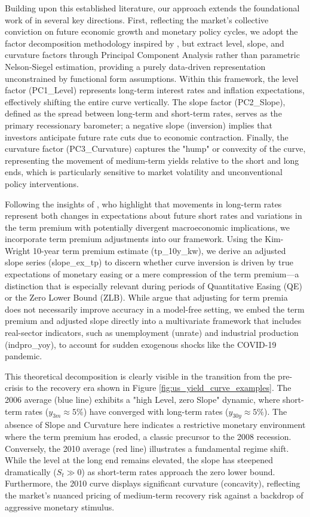 Building upon this established literature, our approach extends the foundational work of \citet{estrellaYieldCurvePredictor1996} in several key directions. First, reflecting the market's collective conviction on future economic growth and monetary policy cycles, we adopt the factor decomposition methodology inspired by \citet{diebold2006forecasting}, but extract level, slope, and curvature factors through Principal Component Analysis rather than parametric Nelson-Siegel estimation, providing a purely data-driven representation unconstrained by functional form assumptions. Within this framework, the level factor (PC1\_Level) represents long-term interest rates and inflation expectations, effectively shifting the entire curve vertically. The slope factor (PC2\_Slope), defined as the spread between long-term and short-term rates, serves as the primary recessionary barometer; a negative slope (inversion) implies that investors anticipate future rate cuts due to economic contraction. Finally, the curvature factor (PC3\_Curvature) captures the "hump" or convexity of the curve, representing the movement of medium-term yields relative to the short and long ends, which is particularly sensitive to market volatility and unconventional policy interventions.

Following the insights of \citet{rudebusch2006macroeconomic}, who highlight that movements in long-term rates represent both changes in expectations about future short rates and variations in the term premium with potentially divergent macroeconomic implications, we incorporate term premium adjustments into our framework. Using the Kim-Wright 10-year term premium estimate (tp\_10y\_kw), we derive an adjusted slope series (slope\_ex\_tp) to discern whether curve inversion is driven by true expectations of monetary easing or a mere compression of the term premium—a distinction that is especially relevant during periods of Quantitative Easing (QE) or the Zero Lower Bound (ZLB). While \citet{bauer2018information} argue that adjusting for term premia does not necessarily improve accuracy in a model-free setting, we embed the term premium and adjusted slope directly into a multivariate framework that includes real-sector indicators, such as unemployment (unrate) and industrial production (indpro\_yoy), to account for sudden exogenous shocks like the COVID-19 pandemic.

This theoretical decomposition is clearly visible in the transition from the pre-crisis to the recovery era shown in Figure \ref{fig:us_yield_curve_examples}. The 2006 average (blue line) exhibits a "high Level, zero Slope" dynamic, where short-term rates ($y_{3m} \approx 5\%$) have converged with long-term rates ($y_{30y} \approx 5\%$). The absence of Slope and Curvature here indicates a restrictive monetary environment where the term premium has eroded, a classic precursor to the 2008 recession. Conversely, the 2010 average (red line) illustrates a fundamental regime shift. While the level at the long end remains elevated, the slope has steepened dramatically ($S_t \gg 0$) as short-term rates approach the zero lower bound. Furthermore, the 2010 curve displays significant curvature (concavity), reflecting the market's nuanced pricing of medium-term recovery risk against a backdrop of aggressive monetary stimulus.

